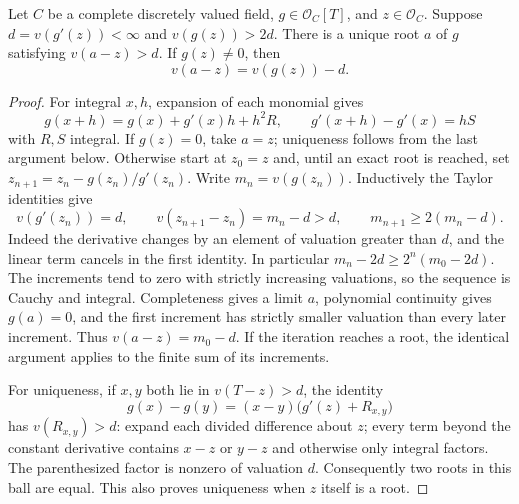 \begin{lemma}
\label{fw:separable-newton-lifting}
\leanok
Let $C$ be a complete discretely valued field,
$g\in\mathcal O_C[T]$, and $z\in\mathcal O_C$. Suppose
$d=v(g'(z))<\infty$ and $v(g(z))>2d$. There is a unique root $a$ of
$g$ satisfying $v(a-z)>d$. If $g(z)\ne0$, then
\[
 v(a-z)=v(g(z))-d.
\]
\end{lemma}
\begin{proof}
For integral $x,h$, expansion of each monomial gives
\[
 g(x+h)=g(x)+g'(x)h+h^2R,
 \qquad g'(x+h)-g'(x)=hS
\]
with $R,S$ integral. If $g(z)=0$, take $a=z$; uniqueness follows
from the last argument below. Otherwise start at $z_0=z$ and, until
an exact root is reached, set $z_{n+1}=z_n-g(z_n)/g'(z_n)$.
Write $m_n=v(g(z_n))$. Inductively the Taylor identities give
\[
 v(g'(z_n))=d,\qquad
 v(z_{n+1}-z_n)=m_n-d>d,\qquad
 m_{n+1}\geq2(m_n-d).
\]
Indeed the derivative changes by an element of valuation greater than
$d$, and the linear term cancels in the first identity. In particular
$m_n-2d\geq2^n(m_0-2d)$. The increments tend to zero with strictly
increasing valuations, so the sequence is Cauchy and integral.
Completeness gives a limit $a$, polynomial continuity gives $g(a)=0$,
and the first increment has strictly smaller valuation than every
later increment. Thus $v(a-z)=m_0-d$. If the iteration reaches a root,
the identical argument applies to the finite sum of its increments.

For uniqueness, if $x,y$ both lie in $v(T-z)>d$, the identity
\[
 g(x)-g(y)=(x-y)\bigl(g'(z)+R_{x,y}\bigr)
\]
has $v(R_{x,y})>d$: expand each divided difference about $z$;
every term beyond the constant derivative contains $x-z$ or $y-z$
and otherwise only integral factors. The parenthesized factor is
nonzero of valuation $d$. Consequently two roots in this ball are
equal. This also proves uniqueness when $z$ itself is a root.
\end{proof}

